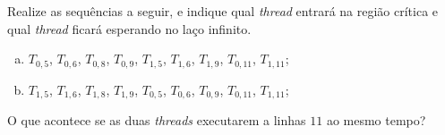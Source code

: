 Realize as sequências a seguir, e indique qual {\em thread} entrará na
região crítica e qual {\em thread} ficará esperando no laço infinito.

\begin{enumerate}[a)]

\item $T_{0,5}$, $T_{0,6}$, $T_{0,8}$, $T_{0,9}$, $T_{1,5}$, $T_{1,6}$,
$T_{1,9}$, $T_{0,11}$, $T_{1,11}$;

\item $T_{1,5}$, $T_{1,6}$, $T_{1,8}$, $T_{1,9}$, $T_{0,5}$, $T_{0,6}$,
$T_{0,9}$, $T_{0,11}$, $T_{1,11}$;

\end{enumerate}

O que acontece se as duas {\em threads} executarem a linhas $11$ ao
mesmo tempo?
